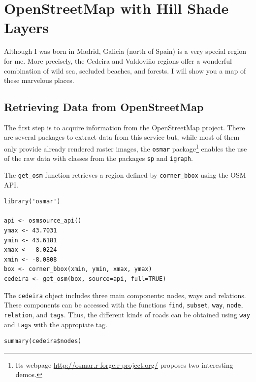 \documentclass[smallroyalvopaper]{memoir}
\begin{document}
\section{\floweroneleft OpenStreetMap with Hill Shade Layers}
\label{sec-1}

Although I was born in Madrid, Galicia (north of Spain) is a very
special region for me. More precisely, the Cedeira and Valdoviño
regions offer a wonderful combination of wild sea, secluded beaches,
and forests. I will show you a map of these marvelous places.

\subsection{Retrieving Data from OpenStreetMap}
\label{sec-1-1}
The first step is to acquire information from the OpenStreetMap
project. There are several packages to extract data from this service
but, while most of them only provide already rendered raster images,
the \texttt{osmar} package\footnote{Its webpage \url{http://osmar.r-forge.r-project.org/} proposes
two interesting demos.} \cite{Eugster.Schlesinger2010} enables the
use of the raw data with classes from the packages \texttt{sp} and \texttt{igraph}.

The \texttt{get\_osm} function retrieves a region defined by \texttt{corner\_bbox}
using the OSM API.


\lstset{language=R,numbers=none}
\begin{lstlisting}
library('osmar')

api <- osmsource_api()
ymax <- 43.7031
ymin <- 43.6181
xmax <- -8.0224
xmin <- -8.0808
box <- corner_bbox(xmin, ymin, xmax, ymax)
cedeira <- get_osm(box, source=api, full=TRUE)
\end{lstlisting}

The \texttt{cedeira} object includes three main components: nodes, ways and
relations. These components can be accessed with the functions \texttt{find},
\texttt{subset}, \texttt{way}, \texttt{node}, \texttt{relation}, and \texttt{tags}. Thus, the different
kinds of roads can be obtained using \texttt{way} and \texttt{tags} with the
appropiate tag.

\lstset{language=R,numbers=none}
\begin{lstlisting}
summary(cedeira$nodes)
\end{lstlisting}
\end{document}
